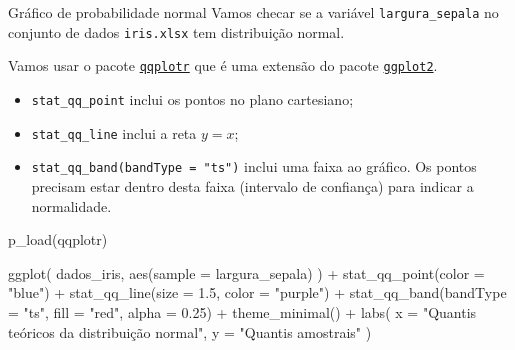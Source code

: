 \documentclass[
  10pt,
  ignorenonframetext,
]{beamer}
\newenvironment{Shaded}{\begin{snugshade}}{\end{snugshade}}
\newcommand{\AttributeTok}[1]{\textcolor[rgb]{0.40,0.45,0.13}{#1}}
\newcommand{\FloatTok}[1]{\textcolor[rgb]{0.68,0.00,0.00}{#1}}
\newcommand{\FunctionTok}[1]{\textcolor[rgb]{0.28,0.35,0.67}{#1}}
\newcommand{\NormalTok}[1]{\textcolor[rgb]{0.00,0.23,0.31}{#1}}
\newcommand{\SpecialCharTok}[1]{\textcolor[rgb]{0.37,0.37,0.37}{#1}}
\newcommand{\StringTok}[1]{\textcolor[rgb]{0.13,0.47,0.30}{#1}}
\providecommand{\tightlist}{%
  \setlength{\itemsep}{0pt}\setlength{\parskip}{0pt}}\usepackage{longtable,booktabs,array}
\begin{document}
\begin{frame}[fragile]{Gráfico de probabilidade normal}
\protect\hypertarget{gruxe1fico-de-probabilidade-normal}{}
Vamos checar se a variável \texttt{largura\_sepala} no conjunto de dados
\texttt{iris.xlsx} tem distribuição normal.

Vamos usar o pacote
\href{https://aloy.github.io/qqplotr/}{\texttt{qqplotr}} que é uma
extensão do pacote
\href{https://ggplot2.tidyverse.org/index.html}{\texttt{ggplot2}}.

\begin{itemize}
\tightlist
\item
  \texttt{stat\_qq\_point} inclui os pontos no plano cartesiano;
\item
  \texttt{stat\_qq\_line} inclui a reta \(y=x\);
\item
  \texttt{stat\_qq\_band(bandType\ =\ "ts")} inclui uma faixa ao
  gráfico. Os pontos precisam estar dentro desta faixa (intervalo de
  confiança) para indicar a normalidade.
\end{itemize}
\end{frame}

\begin{frame}[fragile]
\begin{Shaded}
\begin{Highlighting}[]
\FunctionTok{p\_load}\NormalTok{(qqplotr)}

\FunctionTok{ggplot}\NormalTok{(}
\NormalTok{  dados\_iris,}
  \FunctionTok{aes}\NormalTok{(}\AttributeTok{sample =}\NormalTok{ largura\_sepala)}
\NormalTok{) }\SpecialCharTok{+}
  \FunctionTok{stat\_qq\_point}\NormalTok{(}\AttributeTok{color =} \StringTok{"blue"}\NormalTok{) }\SpecialCharTok{+}
  \FunctionTok{stat\_qq\_line}\NormalTok{(}\AttributeTok{size =} \FloatTok{1.5}\NormalTok{, }\AttributeTok{color =} \StringTok{"purple"}\NormalTok{) }\SpecialCharTok{+}
  \FunctionTok{stat\_qq\_band}\NormalTok{(}\AttributeTok{bandType =} \StringTok{"ts"}\NormalTok{, }\AttributeTok{fill =} \StringTok{"red"}\NormalTok{, }\AttributeTok{alpha =} \FloatTok{0.25}\NormalTok{) }\SpecialCharTok{+}
  \FunctionTok{theme\_minimal}\NormalTok{() }\SpecialCharTok{+}
  \FunctionTok{labs}\NormalTok{(}
    \AttributeTok{x =} \StringTok{"Quantis teóricos da distribuição normal"}\NormalTok{,}
    \AttributeTok{y =} \StringTok{"Quantis amostrais"}
\NormalTok{  )}
\end{Highlighting}
\end{Shaded}
\end{frame}
\end{document}
